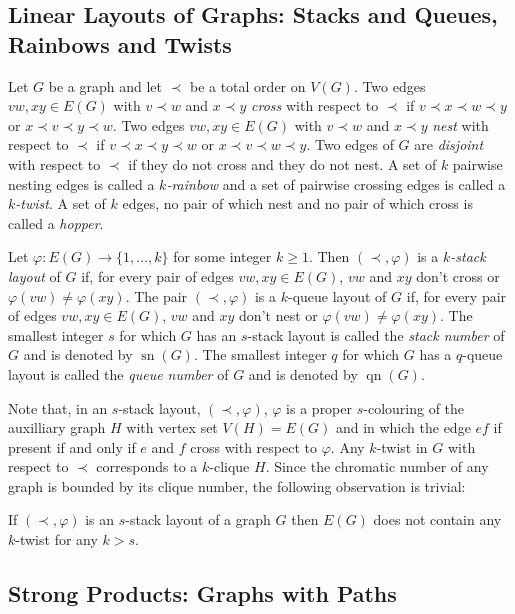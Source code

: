 \documentclass[kpfonts]{patmorin}
\DeclareMathOperator{\sn}{sn}
\DeclareMathOperator{\qn}{qn}
\begin{document}
\subsection{Linear Layouts of Graphs: Stacks and Queues, Rainbows and Twists}

Let $G$ be a graph and let $\prec$ be a total order on $V(G)$.  Two edges $vw,xy\in E(G)$ with $v\prec w$ and $x\prec y$ \emph{cross} with respect to $\prec$ if $v\prec x\prec w\prec y$ or $x\prec v\prec y\prec w$. Two edges $vw,xy\in E(G)$ with $v\prec w$ and $x\prec y$ \emph{nest} with respect to $\prec$ if $v\prec x\prec y\prec w$ or $x\prec v\prec w\prec y$.  Two edges of $G$ are \emph{disjoint} with respect to $\prec$ if they do not cross and they do not nest. A set of $k$ pairwise nesting edges is called a \emph{$k$-rainbow} and a set of pairwise crossing edges is called a \emph{$k$-twist}.  A set of $k$ edges, no pair of which nest and no pair of which cross is called a \emph{hopper}.

Let $\varphi:E(G)\to\{1,\ldots,k\}$ for some integer $k\ge 1$.  Then $(\prec,\varphi)$ is a \emph{$k$-stack layout} of $G$ if, for every pair of edges $vw,xy\in E(G)$, $vw$ and $xy$ don't cross or $\varphi(vw)\neq\varphi(xy)$. The pair $(\prec,\varphi)$ is a $k$-queue layout of $G$ if, for every pair of edges $vw,xy\in E(G)$, $vw$ and $xy$ don't nest or $\varphi(vw)\neq\varphi(xy)$.  The smallest integer $s$ for which $G$ has an $s$-stack layout is called the \emph{stack number} of $G$ and is denoted by $\sn(G)$.  The smallest integer $q$ for which $G$ has a $q$-queue layout is called the \emph{queue number} of $G$ and is denoted by $\qn(G)$.  

Note that, in an $s$-stack layout, $(\prec,\varphi)$, $\varphi$ is a proper $s$-colouring of the auxilliary graph $H$ with vertex set $V(H)=E(G)$ and in which the edge $ef$ if present if and only if $e$ and $f$ cross with respect to $\varphi$.  Any $k$-twist in $G$ with respect to $\prec$ corresponds to a $k$-clique $H$.  Since the chromatic number of any graph is bounded by its clique number, the following observation is trivial:

\begin{obs}
  If $(\prec,\varphi)$ is an $s$-stack layout of a graph $G$ then $E(G)$ does not contain any $k$-twist for any $k>s$.
\end{obs}


\subsection{Strong Products: Graphs with Paths}
\end{document}
